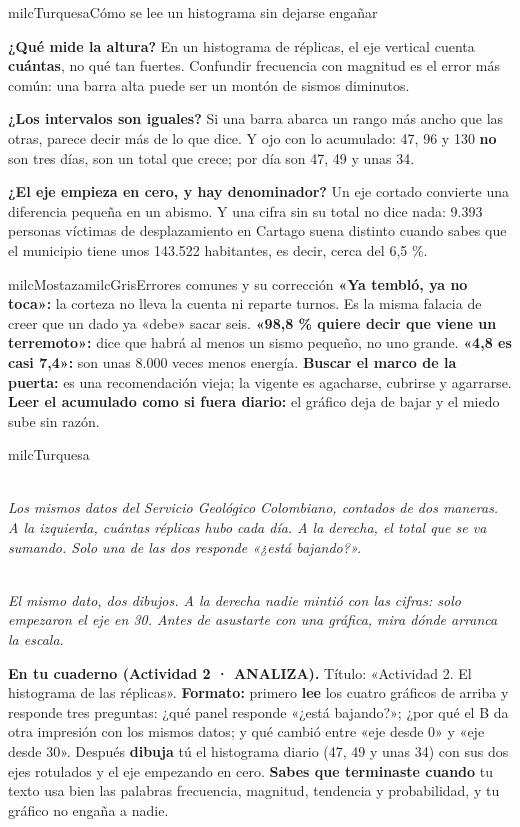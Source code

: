 \documentclass[11pt,letterpaper]{article}
\newcommand{\guiaDiagrama}[2]{%
\begin{center}
\\[1.5mm]
{\footnotesize\itshape\textcolor{milcNegro!75}{#2}}
\end{center}
}
\begin{document}
\begin{drawbox}{milcTurquesa}{Cómo se lee un histograma sin dejarse engañar}
\begin{pasoslista}
\item \textbf{¿Qué mide la altura?} En un histograma de réplicas, el eje vertical cuenta \textbf{cuántas}, no qué tan fuertes. Confundir frecuencia con magnitud es el error más común: una barra alta puede ser un montón de sismos diminutos.
\item \textbf{¿Los intervalos son iguales?} Si una barra abarca un rango más ancho que las otras, parece decir más de lo que dice. Y ojo con lo acumulado: 47, 96 y 130 \textbf{no} son tres días, son un total que crece; por día son 47, 49 y unas 34.
\item \textbf{¿El eje empieza en cero, y hay denominador?} Un eje cortado convierte una diferencia pequeña en un abismo. Y una cifra sin su total no dice nada: 9.393 personas víctimas de desplazamiento en Cartago suena distinto cuando sabes que el municipio tiene unos 143.522 habitantes, es decir, cerca del 6,5 \%.
\end{pasoslista}
\end{drawbox}

\begin{softbox}{milcMostaza}{milcGris}{Errores comunes y su corrección}
\textbf{«Ya tembló, ya no toca»:} la corteza no lleva la cuenta ni reparte turnos. Es la misma falacia de creer que un dado ya «debe» sacar seis. \textbf{«98,8 \% quiere decir que viene un terremoto»:} dice que habrá al menos un sismo pequeño, no uno grande. \textbf{«4,8 es casi 7,4»:} son unas 8.000 veces menos energía. \textbf{Buscar el marco de la puerta:} es una recomendación vieja; la vigente es agacharse, cubrirse y agarrarse. \textbf{Leer el acumulado como si fuera diario:} el gráfico deja de bajar y el miedo sube sin razón.
\end{softbox}

\begin{infoband}{milcTurquesa}
\guiaDiagrama{assets/10-9/histograma-replicas.tikz}{Los mismos datos del Servicio Geológico Colombiano, contados de dos maneras. A la izquierda, cuántas réplicas hubo cada día. A la derecha, el total que se va sumando. Solo una de las dos responde «¿está bajando?».}
\guiaDiagrama{assets/10-9/eje-truncado.tikz}{El mismo dato, dos dibujos. A la derecha nadie mintió con las cifras: solo empezaron el eje en 30. Antes de asustarte con una gráfica, mira dónde arranca la escala.}

\textbf{En tu cuaderno (Actividad 2 · ANALIZA).} Título: «Actividad 2. El histograma de las réplicas». \textbf{Formato:} primero \textbf{lee} los cuatro gráficos de arriba y responde tres preguntas: ¿qué panel responde «¿está bajando?»; ¿por qué el B da otra impresión con los mismos datos; y qué cambió entre «eje desde 0» y «eje desde 30». Después \textbf{dibuja} tú el histograma diario (47, 49 y unas 34) con sus dos ejes rotulados y el eje empezando en cero. \textbf{Sabes que terminaste cuando} tu texto usa bien las palabras frecuencia, magnitud, tendencia y probabilidad, y tu gráfico no engaña a nadie.
\end{infoband}
\end{document}
